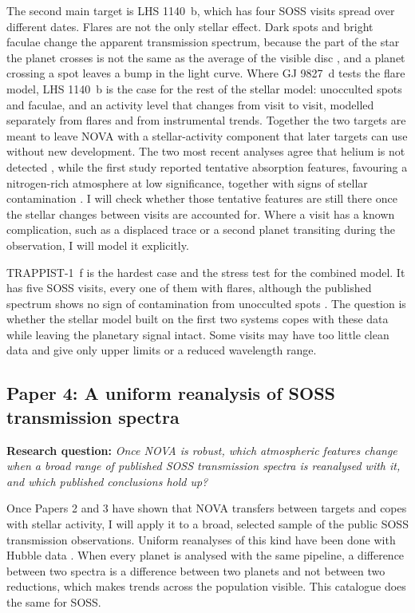 The second main target is LHS 1140~b, which has four SOSS visits spread
over different dates. Flares are not the only stellar effect. Dark spots
and bright faculae change the apparent transmission spectrum, because the
part of the star the planet crosses is not the same as the average of the
visible disc \citep{RackhamEtAl2018,RackhamEtAl2019}, and a planet
crossing a spot leaves a bump in the light curve. Where GJ 9827~d tests
the flare model, LHS 1140~b is the case for the rest of the stellar
model: unocculted spots and faculae, and an activity level that changes
from visit to visit, modelled separately from flares and from
instrumental trends. Together the two targets are meant to leave NOVA
with a stellar-activity component that later targets can use without new
development. The two most recent analyses agree that helium is
not detected \citep{GressierEtAl2026,BennettEtAl2026}, while the first
study reported tentative absorption features, favouring a nitrogen-rich
atmosphere at low significance, together with signs of stellar
contamination \citep{CadieuxEtAl2024}. I will check whether those
tentative features are still there once the stellar changes between
visits are accounted for. Where a visit has a known complication, such as
a displaced trace or a second planet transiting during the observation, I
will model it explicitly.

TRAPPIST-1~f is the hardest case and the stress test for the combined
model. It has five SOSS visits, every one of them with flares, although
the published spectrum shows no sign of contamination from unocculted
spots \citep{LimEtAl2026}. The question is whether the stellar model
built on the first two systems copes with these data while leaving the
planetary signal intact. Some visits may have too little clean data and
give only upper limits or a reduced wavelength range.

\subsection{Paper 4: A uniform reanalysis of SOSS transmission spectra}
\label{subsec:fw_atlas}

\noindent\textbf{Research question:} \textit{Once NOVA is robust, which
atmospheric features change when a broad range of published SOSS
transmission spectra is reanalysed with it, and which published
conclusions hold up?}

Once Papers 2 and 3 have shown that NOVA transfers between targets and
copes with stellar activity, I will apply it to a broad, selected sample
of the public SOSS transmission observations. Uniform reanalyses of this
kind have been done with Hubble data \citep{TsiarasEtAl2018,SabaEtAl2025}.
When every planet is analysed with the same pipeline, a difference between
two spectra is a difference between two planets and not between two
reductions, which makes trends across the population visible. This
catalogue does the same for SOSS.

